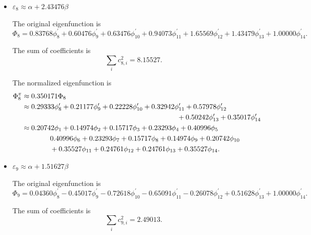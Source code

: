 \documentclass[a4paper]{book}
\begin{document}
\begin{solution}
\begin{enumerate}[label=(\alph*)]
		\begin{itemize}
		
		\item $\varepsilon_8 \approx \alpha + 2.43476 \beta$
		
		The original eigenfunction is
		\begin{equation*}
			\Phi_8 = 0.83768 \phi^\prime_8 + 0.60476 \phi^\prime_9 + 0.63476 \phi^\prime_{10} + 0.94073 \phi^\prime_{11} + 1.65569 \phi^\prime_{12} + 1.43479 \phi^\prime_{13} + 1.00000 \phi^\prime_{14}.
		\end{equation*}
		
		The sum of coefficients is
		\begin{equation*}
			\sum_{i} c^2_{8,i} = 8.15527.
		\end{equation*}
		
		The normalized eigenfunction is		
		\begin{align}
			\Phi^\pi_8 &\approx 0.350171 \Phi_8 \notag \\
			&\approx 0.29333 \phi^\prime_8 + 0.21177 \phi^\prime_9 + 0.22228 \phi^\prime_{10} + 0.32942 \phi^\prime_{11} + 0.57978 \phi^\prime_{12}  \notag\\
			&\hspace*{22em} + 0.50242 \phi^\prime_{13} + 0.35017 \phi^\prime_{14} \notag \\
			&\approx 0.20742 \phi_1 + 0.14974 \phi_2 + 0.15717 \phi_3 + 0.23293 \phi_4 + 0.40996 \phi_5  \notag \\
			&\hspace*{4em} 0.40996\phi_6 +0.23293 \phi_7 + 0.15717 \phi_8 +0.14974 \phi_9  +0.20742 \phi_{10} \notag \\
			&\hspace*{4em} +0.35527 \phi_{11} + 0.24761 \phi_{12} + 0.24761 \phi_{13} + 0.35527 \phi_{14} .
		\end{align}
		
		
		\item $\varepsilon_9 \approx \alpha + 1.51627 \beta$
		
		The original eigenfunction is
		\begin{equation*}
			\Phi_9 = 0.04360 \phi^\prime_8 - 0.45017 \phi^\prime_9 -0.72618 \phi^\prime_{10} -0.65091 \phi^\prime_{11} -0.26078 \phi^\prime_{12} + 0.51628 \phi^\prime_{13} + 1.00000 \phi^\prime_{14}.
		\end{equation*}
		
		The sum of coefficients is
		\begin{equation*}
			\sum_{i} c^2_{9,i} = 2.49013.
		\end{equation*}
		

\end{itemize}
\end{enumerate}
\end{solution}
\end{document}
